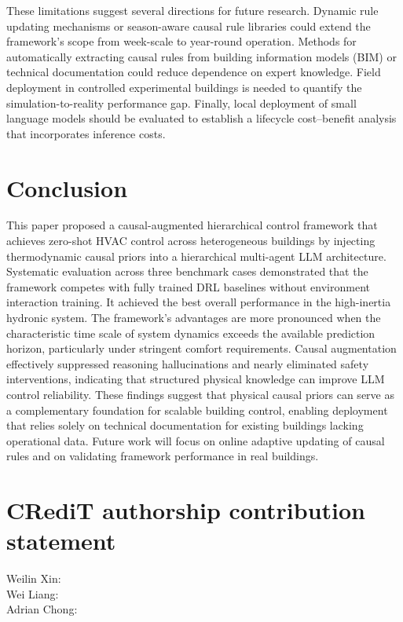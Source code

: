 \documentclass[a4paper]{cas-sc}
\begin{document}
These limitations suggest several directions for future research. Dynamic rule updating mechanisms or season-aware causal rule libraries could extend the framework's scope from week-scale to year-round operation. Methods for automatically extracting causal rules from building information models (BIM) or technical documentation could reduce dependence on expert knowledge. Field deployment in controlled experimental buildings is needed to quantify the simulation-to-reality performance gap. Finally, local deployment of small language models should be evaluated to establish a lifecycle cost--benefit analysis that incorporates inference costs.

\section{Conclusion}
\label{sec:conclusion}

This paper proposed a causal-augmented hierarchical control framework that achieves zero-shot HVAC control across heterogeneous buildings by injecting thermodynamic causal priors into a hierarchical multi-agent LLM architecture. Systematic evaluation across three benchmark cases demonstrated that the framework competes with fully trained DRL baselines without environment interaction training. It achieved the best overall performance in the high-inertia hydronic system. The framework's advantages are more pronounced when the characteristic time scale of system dynamics exceeds the available prediction horizon, particularly under stringent comfort requirements. Causal augmentation effectively suppressed reasoning hallucinations and nearly eliminated safety interventions, indicating that structured physical knowledge can improve LLM control reliability. These findings suggest that physical causal priors can serve as a complementary foundation for scalable building control, enabling deployment that relies solely on technical documentation for existing buildings lacking operational data. Future work will focus on online adaptive updating of causal rules and on validating framework performance in real buildings.

\section*{CRediT authorship contribution statement}
\begin{description}
    \item[Weilin Xin:]
    \item[Wei Liang:]
    \item[Adrian Chong:]
\end{description}
\end{document}
